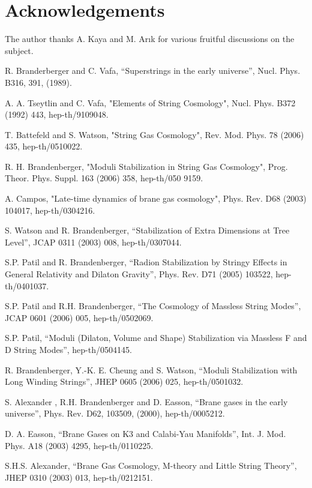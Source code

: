 \documentclass[aps,floatfix,twocolumn,amsmath]{revtex4}
\begin{document}
\section{Acknowledgements}
The author thanks A. Kaya and M. Ar{\i}k for various fruitful discussions on the subject.

\begin{thebibliography}{100}


 R. Branderberger and C. Vafa, ``Superstrings in the
early universe'', Nucl. Phys. B316, 391, (1989).

 A. A. Tseytlin and C. Vafa, "Elements of String Cosmology",  Nucl. Phys. B372 (1992) 443, hep-th/9109048.

  T. Battefeld and S. Watson, "String Gas Cosmology", Rev. Mod. Phys. 78 (2006) 435, hep-th/0510022.

 R. H. Brandenberger, "Moduli Stabilization in String Gas Cosmology", Prog. Theor. Phys. Suppl. 163 (2006) 358, hep-th/050
9159.

 A. Campos, "Late-time dynamics of brane gas cosmology", Phys. Rev. D68 (2003) 104017, hep-th/0304216.

 S. Watson and R. Brandenberger, ``Stabilization of Extra
  Dimensions at Tree Level'', JCAP 0311 (2003) 008, hep-th/0307044.

  S.P. Patil and R. Brandenberger, ``Radion
  Stabilization by Stringy Effects in General Relativity and Dilaton
  Gravity'', Phys. Rev. D71 (2005) 103522, hep-th/0401037.

 S.P. Patil and R.H. Brandenberger, ``The Cosmology of
  Massless String Modes'', JCAP 0601 (2006) 005, hep-th/0502069.

 S.P. Patil, ``Moduli (Dilaton, Volume and Shape)
Stabilization via Massless F and D String Modes'', hep-th/0504145.

 R. Brandenberger, Y.-K. E. Cheung and S. Watson,
  ``Moduli Stabilization with Long Winding Strings'', JHEP 0605 (2006) 025,
  hep-th/0501032.

 S. Alexander , R.H. Brandenberger and D. Easson,
``Brane gases in the early universe'',  Phys. Rev. D62, 103509, (2000),
hep-th/0005212.

 D. A. Easson, ``Brane Gases on K3 and Calabi-Yau
  Manifolds'', Int. J. Mod. Phys. A18 (2003) 4295, hep-th/0110225.

 S.H.S. Alexander, ``Brane Gas Cosmology, M-theory and Little
  String Theory'', JHEP 0310 (2003) 013, hep-th/0212151.



\end{thebibliography}
\end{document}
